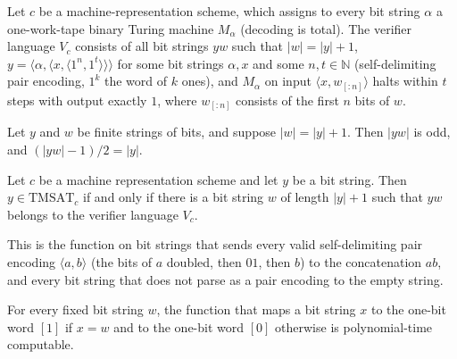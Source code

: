 \begin{definition}
\label{Complexity.tmsatVerifier}
\leanok
{}
Let $c$ be a machine-representation scheme, which assigns to every bit string $\alpha$ a one-work-tape binary Turing machine $M_\alpha$ (decoding is total). The verifier language $V_c$ consists of all bit strings $yw$ such that $|w| = |y| + 1$, $y = \langle\alpha,\langle x,\langle 1^n,1^t\rangle\rangle\rangle$ for some bit strings $\alpha, x$ and some $n, t \in \mathbb{N}$ (self-delimiting pair encoding, $1^k$ the word of $k$ ones), and $M_\alpha$ on input $\langle x, w_{[:n]}\rangle$ halts within $t$ steps with output exactly $1$, where $w_{[:n]}$ consists of the first $n$ bits of $w$.
\end{definition}

\begin{lemma}
\label{Complexity.tmsat_split_length}
\leanok
{}
Let $y$ and $w$ be finite strings of bits, and suppose $|w|=|y|+1$. Then $|yw|$ is odd,
and $(|yw|-1)/2=|y|$.
\end{lemma}

\begin{lemma}
\label{Complexity.tmsat_certificate_equiv}
\leanok
{}
Let $c$ be a machine representation scheme and let $y$ be a bit string. Then
$y\in\mathrm{TMSAT}_c$ if and only if there is a bit string $w$ of length $|y|+1$ such
that $yw$ belongs to the verifier language $V_c$.
\end{lemma}

\begin{definition}
\label{Complexity.tmsatConcat}
\leanok
{}
This is the function on bit strings that sends every valid self-delimiting pair encoding $\langle a,b\rangle$ (the bits of $a$ doubled, then $01$, then $b$) to the concatenation $ab$, and every bit string that does not parse as a pair encoding to the empty string.
\end{definition}

\begin{lemma}
\label{Complexity.tmsat_pt_eq}
\leanok
{}
For every fixed bit string $w$, the function that maps a bit string $x$ to the one-bit
word $[1]$ if $x=w$ and to the one-bit word $[0]$ otherwise is polynomial-time
computable.
\end{lemma}

